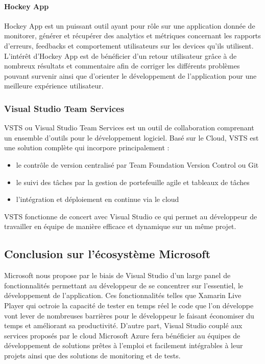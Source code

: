 \documentclass[11]{article}
\begin{document}
\paragraph{Hockey App}
Hockey App est un puissant outil ayant pour rôle sur une application donnée de monitorer, générer et récupérer des analytics et métriques concernant les rapports d’erreurs, feedbacks et comportement utilisateurs sur les devices qu’ils utilisent.
L’intérêt d’Hockey App est de bénéficier d’un retour utilisateur grâce à de nombreux résultats et commentaire afin de corriger les différents problèmes pouvant survenir ainsi que d’orienter le développement de l’application pour une meilleure expérience utilisateur.
 
 \subsubsection{Visual Studio Team Services}  
VSTS ou Visual Studio Team Services est un outil de collaboration comprenant un ensemble d’outils pour le développement logiciel. Basé sur le Cloud, VSTS est une solution complète qui incorpore principalement : 

 \begin{itemize}
\item le contrôle de version centralisé par Team Foundation Version Control ou Git
\item le suivi des tâches par la gestion de portefeuille agile et tableaux de tâches
\item l’intégration et déploiement en continue via le cloud
\end{itemize}
     
\vspace{0.5cm}
   
VSTS fonctionne de concert avec Visual Studio ce qui permet au développeur de travailler en équipe de manière efficace et dynamique sur un même projet.

 
 \subsection{Conclusion sur l'écosystème Microsoft}
 Microsoft nous propose par le biais de Visual Studio d’un large panel de fonctionnalités permettant au développeur de se concentrer sur l’essentiel, le développement de l’application. Ces fonctionnalités telles que Xamarin Live Player qui octroie la capacité de tester en temps réel le code que l’on développe vont lever de nombreuses barrières pour le développeur le faisant économiser du temps et améliorant sa productivité.
D’autre part, Visual Studio couplé aux services proposés par le cloud Microsoft Azure fera bénéficier au équipes de développement de solutions prêtes à l’emploi et facilement intégrables à leur projets ainsi que des solutions de monitoring et de tests.
     
\end{document}
